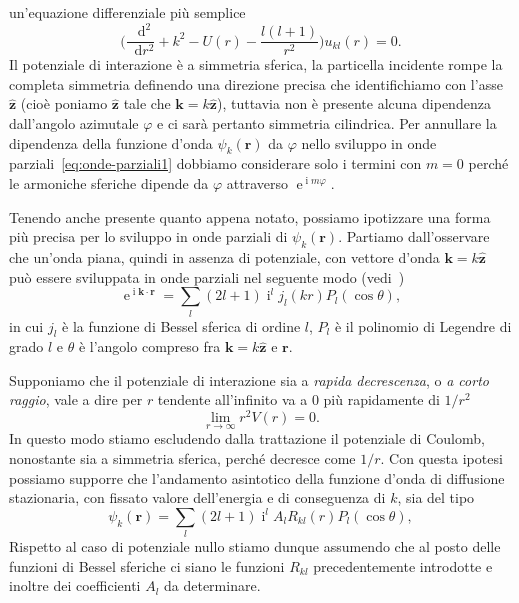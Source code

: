 \documentclass[a4paper,fleqn,twoside,12pt]{article}
\renewcommand{\phi}{\varphi}
\newcommand*{\dd}{\mathop{}\!\mathrm{d}} %
\DeclareMathOperator{\e}{\mathrm{e}} %
\DeclareMathOperator{\uimm}{\mathrm{i}} %
\newcommand*{\toder}[3][]{\frac{{\dd^{#1}}#2}{\dd {#3}^{#1}}}
\newcommand*{\versor}[1]{\hat{\bm{#1}}}
\begin{document}
un'equazione differenziale più semplice
\begin{equation}
  \label{eq:diff-u-op}
  \bigg(\toder[2]{}{r} + k^{2} - U(r) - \frac{l(l+1)}{r^{2}}\bigg)u_{kl}(r) = 0.
\end{equation}
Il potenziale di interazione è a simmetria sferica, la particella incidente
rompe la completa simmetria definendo una direzione precisa che identifichiamo
con l'asse $\versor{z}$ (cioè poniamo $\versor{z}$ tale che
$\bm{k} = k\versor{z}$), tuttavia non è presente alcuna dipendenza dall'angolo
azimutale $\phi$ e ci sarà pertanto simmetria cilindrica.  Per annullare la
dipendenza della funzione d'onda $\psi_{k}(\bm{r})$ da $\phi$ nello sviluppo in
onde parziali~\eqref{eq:onde-parziali1} dobbiamo considerare solo i termini con
$m = 0$ perché le armoniche sferiche dipende da $\phi$ attraverso
$\e^{\uimm m \phi}$.

Tenendo anche presente quanto appena notato, possiamo ipotizzare una forma più
precisa per lo sviluppo in onde parziali di $\psi_{k}(\bm{r})$.  Partiamo
dall'osservare che un'onda piana, quindi in assenza di potenziale, con vettore
d'onda $\bm{k} = k\versor{z}$ può essere sviluppata in onde parziali nel
seguente modo (vedi~\textcite[928-929]{cohen:quantum-mechanics})
\begin{equation}
  \label{eq:sviluppo-onda-piana}
  \e^{\uimm \bm{k}\cdot\bm{r}} = \sum_{l} (2l+1) \uimm^{l} j_{l}(kr)
  P_{l}(\cos\theta),
\end{equation}
in cui $j_{l}$ è la funzione di Bessel sferica di ordine $l$, $P_{l}$ è il
polinomio di Legendre di grado $l$ e $\theta$ è l'angolo compreso fra
$\bm{k} = k\versor{z}$ e $\bm{r}$.

Supponiamo che il potenziale di interazione sia a \emph{rapida decrescenza}, o
\emph{a corto raggio}, vale a dire per $r$ tendente all'infinito va a $0$ più
rapidamente di $1/r^{2}$
\begin{equation}
  \lim_{r \to \infty} r^{2}V(r) = 0.
\end{equation}
In questo modo stiamo escludendo dalla trattazione il potenziale di Coulomb,
nonostante sia a simmetria sferica, perché decresce come $1/r$.  Con questa
ipotesi possiamo supporre che l'andamento asintotico della funzione d'onda di
diffusione stazionaria, con fissato valore dell'energia e di conseguenza di $k$,
sia del tipo
\begin{equation}
  \label{eq:onde-parziali2}
  \psi_{k}(\bm{r}) = \sum_{l} (2l+1)\uimm^{l} A_{l} R_{kl}(r) P_{l}(\cos\theta),
\end{equation}
Rispetto al caso di potenziale nullo stiamo dunque assumendo che al posto delle
funzioni di Bessel sferiche ci siano le funzioni $R_{kl}$ precedentemente
introdotte e inoltre dei coefficienti $A_{l}$ da determinare.
\end{document}
